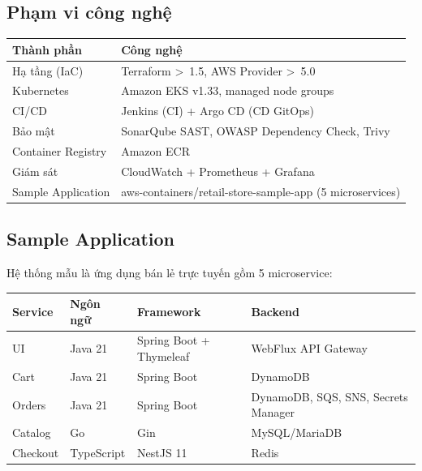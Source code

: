 \documentclass[12pt,a4paper]{article}
\begin{document}
\subsection{Phạm vi công nghệ}

\begin{table}[H]
\centering
\begin{tabular}{@{}ll@{}}
\toprule
\textbf{Thành phần} & \textbf{Công nghệ} \\
\midrule
Hạ tầng (IaC)       & Terraform \textgreater\ 1.5, AWS Provider \textgreater\ 5.0 \\
Kubernetes           & Amazon EKS v1.33, managed node groups \\
CI/CD                & Jenkins (CI) + Argo CD (CD GitOps) \\
Bảo mật              & SonarQube SAST, OWASP Dependency Check, Trivy \\
Container Registry   & Amazon ECR \\
Giám sát             & CloudWatch + Prometheus + Grafana \\
Sample Application   & aws-containers/retail-store-sample-app (5 microservices) \\
\bottomrule
\end{tabular}
\end{table}

\subsection{Sample Application}

Hệ thống mẫu là ứng dụng bán lẻ trực tuyến gồm 5 microservice:

\begin{table}[H]
\centering
\begin{tabular}{@{}llll@{}}
\toprule
\textbf{Service}    & \textbf{Ngôn ngữ} & \textbf{Framework}       & \textbf{Backend} \\
\midrule
UI                  & Java 21           & Spring Boot + Thymeleaf  & WebFlux API Gateway \\
Cart                & Java 21           & Spring Boot              & DynamoDB \\
Orders              & Java 21           & Spring Boot              & DynamoDB, SQS, SNS, Secrets Manager \\
Catalog             & Go                & Gin                      & MySQL/MariaDB \\
Checkout            & TypeScript        & NestJS 11                & Redis \\
\bottomrule
\end{tabular}
\end{table}
\end{document}
